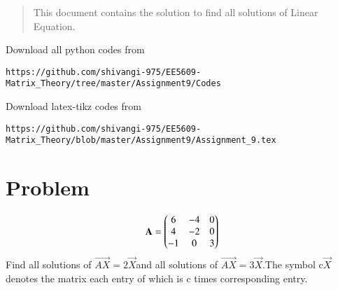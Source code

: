 \documentclass[journal,12pt,twocolumn]{IEEEtran}
\begin{document}
%
\vspace{2ex}
\begin{center}
\end{center}
\begin{abstract}
This document contains the solution to  find all solutions of Linear Equation.
\end{abstract}
Download all python codes from 
%
\begin{lstlisting}
https://github.com/shivangi-975/EE5609-Matrix_Theory/tree/master/Assignment9/Codes
\end{lstlisting}
%
Download latex-tikz codes from 
%
\begin{lstlisting}
https://github.com/shivangi-975/EE5609-Matrix_Theory/blob/master/Assignment9/Assignment_9.tex
\end{lstlisting}
%
\section{Problem}
\begin{align}
\mathbf{A}=
       \begin{pmatrix}6 &-4 & 0\\
             4& -2 & 0\\
             -1 &0 &3\end{pmatrix}
\end{align}\noindent
Find all solutions of $\vec{AX}=2\vec{X}$and all solutions of $\vec{AX}=3\vec{X}$.The symbol c$\vec{X}$ denotes the matrix each entry of which is c times corresponding entry.
%
%	
\end{document}
